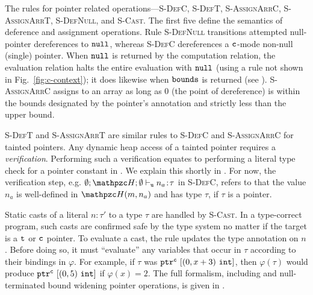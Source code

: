 %
The rules for pointer related operations---\textsc{S-DefC},
\textsc{S-DefT}, \textsc{S-AssignArrC}, \textsc{S-AssignArrT},
\textsc{S-DefNull}, and \textsc{S-Cast}.
The first five define the semantics of deference and assignment operations.
Rule \textsc{S-DefNull} transitions attempted null-pointer
dereferences to $\mathtt{null}$, whereas \textsc{S-DefC} dereferences a $\texttt{c}$-mode
non-null (single) pointer.
When $\mathtt{null}$ is returned by the
computation relation, the evaluation relation halts the entire
evaluation with $\mathtt{null}$ (using a rule not shown in Fig.~\ref{fig:c-context}); it
does likewise when $\mathtt{bounds}$ is returned (see ).
\textsc{S-AssignArrC} assigns to an array as long as 0 (the point of
dereference) is within the bounds designated by the pointer's annotation
and strictly less than the upper bound. 

\textsc{S-DefT} and \textsc{S-AssignArrT} are similar rules to \textsc{S-DefC} and \textsc{S-AssignArrC} for tainted pointers.
Any dynamic heap access of a tainted pointer requires a \textit{verification}.
Performing such a verification equates to performing a literal type check for a pointer constant in .
We explain this shortly in .
For now, the verification step, e.g. $\emptyset;\heap ; \emptyset \vdash_{\umode}\evalue{n_a}{\tau}$ in \textsc{S-DefC},
refers to that the value $n_a$ is well-defined in $\heap(m,n_a)$ and has type $\tau$, if $\tau$ is a pointer.

Static casts of a literal $n\!:\!\tau'$ to a type $\tau$ are handled
by \textsc{S-Cast}. In a type-correct program, such casts are
confirmed safe by the type system no matter
if the target is a $\texttt{t}$ or $\texttt{c}$ pointer. To evaluate a cast, the rule
updates the type annotation on $n$. Before doing so, it must
``evaluate'' any variables that occur in $\tau$ according to their
bindings in $\varphi$. For example, if $\tau$ was
${\mathtt{ptr}^{\texttt{c}}~{[{({0},{x+3})}~{\mathtt{int}}]}}$, then $\varphi(\tau)$ would
produce ${\mathtt{ptr}^{\texttt{c}}~{[{({0},{5})}~{\mathtt{int}}]}}$ if $\varphi(x) = 2$.
The full formalism, including 
and null-terminated bound widening pointer operations, is given in .


